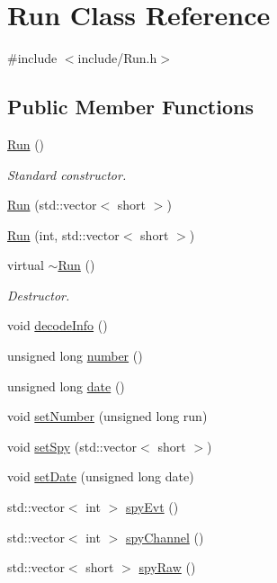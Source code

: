 \hypertarget{classRun}{
\section{Run Class Reference}
\label{classRun}
}


{\ttfamily \#include $<$include/Run.h$>$}\subsection*{Public Member Functions}
\begin{DoxyCompactItemize}
\item 
\hyperlink{classRun_ad9511732117430d7fcdc0c11796f0ef6}{Run} ()
\begin{DoxyCompactList}\small\item\em Standard constructor. \item\end{DoxyCompactList}\item 
\hyperlink{classRun_a45e6035b7001cde5d949b407faf0d8ca}{Run} (std::vector$<$ short $>$)
\item 
\hyperlink{classRun_aa9d670242947e1dc0e31ea68a7938611}{Run} (int, std::vector$<$ short $>$)
\item 
virtual \hyperlink{classRun_a7fa0ac1770a5067113aaa1928be3d742}{$\sim$Run} ()
\begin{DoxyCompactList}\small\item\em Destructor. \item\end{DoxyCompactList}\item 
void \hyperlink{classRun_a2b2687a21cbe4b0b528bdb802a0ee585}{decodeInfo} ()
\item 
unsigned long \hyperlink{classRun_aab2f7571f6348643011d538d05200f46}{number} ()
\item 
unsigned long \hyperlink{classRun_ae5f87d35674ded8f7a0d0ca3d842a7b4}{date} ()
\item 
void \hyperlink{classRun_a0ad734e3ee75d2b58631e5b237a55f5d}{setNumber} (unsigned long run)
\item 
void \hyperlink{classRun_a391d15d3d908d3d011214dba1a075277}{setSpy} (std::vector$<$ short $>$)
\item 
void \hyperlink{classRun_ad6c534e3fdce5978250ca04791934680}{setDate} (unsigned long date)
\item 
std::vector$<$ int $>$ \hyperlink{classRun_a01c526576b5b821696229b53f6afd624}{spyEvt} ()
\item 
std::vector$<$ int $>$ \hyperlink{classRun_a9ab05b137c79436688d59fba008f8078}{spyChannel} ()
\item 
std::vector$<$ short $>$ \hyperlink{classRun_af386b1e6d814454e347c5bd90b20bf2c}{spyRaw} ()
\end{DoxyCompactItemize}
